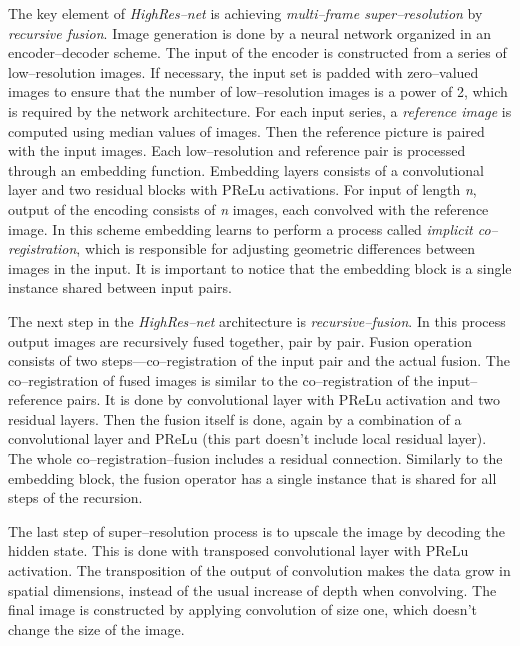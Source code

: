 The key element of \textit{HighRes--net} is achieving \textit{multi--frame super--resolution} by \textit{recursive fusion}.
Image generation is done by a neural network organized in an encoder--decoder scheme.
The input of the encoder is constructed from a series of low--resolution images.
If necessary, the input set is padded with zero--valued images to ensure that the number of low--resolution images is a power of 2, which is required by the network architecture.
For each input series, a \textit{reference image} is computed using median values of images.
Then the reference picture is paired with the input images.
Each low--resolution and reference pair is processed through an embedding function.
Embedding layers consists of a convolutional layer and two residual blocks with PReLu activations.
For input of length \textit{n}, output of the encoding consists of \textit{n} images, each convolved with the reference image.
In this scheme embedding learns to perform a process called \textit{implicit co--registration}, which is responsible for adjusting geometric differences between images in the input.
It is important to notice that the embedding block is a single instance shared between input pairs.

The next step in the \textit{HighRes--net} architecture is \textit{recursive--fusion}.
In this process output images are recursively fused together, pair by pair.
Fusion operation consists of two steps---co--registration of the input pair and the actual fusion.
The co--registration of fused images is similar to the co--registration of the input--reference pairs.
It is done by convolutional layer with PReLu activation and two residual layers.
Then the fusion itself is done, again by a combination of a convolutional layer and PReLu (this part doesn't include local residual layer).
The whole co--registration--fusion includes a residual connection.
Similarly to the embedding block, the fusion operator has a single instance that is shared for all steps of the recursion.

The last step of super--resolution process is to upscale the image by decoding the hidden state.
This is done with transposed convolutional layer with PReLu activation.
The transposition of the output of convolution makes the data grow in spatial dimensions, instead of the usual increase of depth when convolving.
The final image is constructed by applying convolution of size one, which doesn't change the size of the image.

